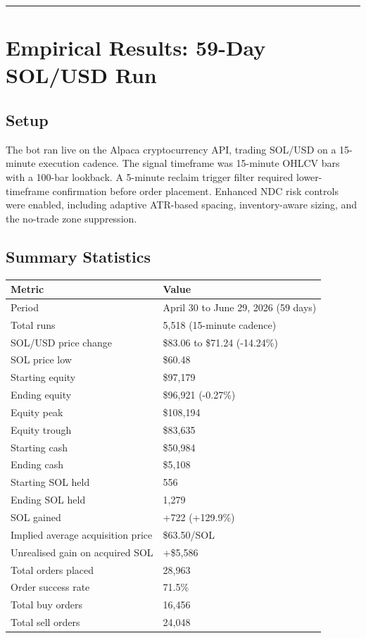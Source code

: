 \documentclass[12pt]{article}
\begin{document}
\begin{center}\rule{0.5\linewidth}{0.5pt}\end{center}

\section{Empirical Results: 59-Day SOL/USD Run}\label{empirical-results-59-day-solusd-run}

\subsection{Setup}\label{setup}

The bot ran live on the Alpaca cryptocurrency API, trading SOL/USD on a
15-minute execution cadence. The signal timeframe was 15-minute OHLCV
bars with a 100-bar lookback. A 5-minute reclaim trigger filter required
lower-timeframe confirmation before order placement. Enhanced NDC risk
controls were enabled, including adaptive ATR-based spacing,
inventory-aware sizing, and the no-trade zone suppression.

\subsection{Summary Statistics}\label{summary-statistics}

\begin{longtable}[]{@{}ll@{}}
\toprule\noalign{}
Metric & Value \\
\midrule\noalign{}
\endhead
\bottomrule\noalign{}
\endlastfoot
Period & April 30 to June 29, 2026 (59 days) \\
Total runs & 5,518 (15-minute cadence) \\
SOL/USD price change & \$83.06 to \$71.24 (-14.24\%) \\
SOL price low & \$60.48 \\
Starting equity & \$97,179 \\
Ending equity & \$96,921 (-0.27\%) \\
Equity peak & \$108,194 \\
Equity trough & \$83,635 \\
Starting cash & \$50,984 \\
Ending cash & \$5,108 \\
Starting SOL held & 556 \\
Ending SOL held & 1,279 \\
SOL gained & +722 (+129.9\%) \\
Implied average acquisition price & \$63.50/SOL \\
Unrealised gain on acquired SOL & +\$5,586 \\
Total orders placed & 28,963 \\
Order success rate & 71.5\% \\
Total buy orders & 16,456 \\
Total sell orders & 24,048 \\
\end{longtable}
\end{document}
